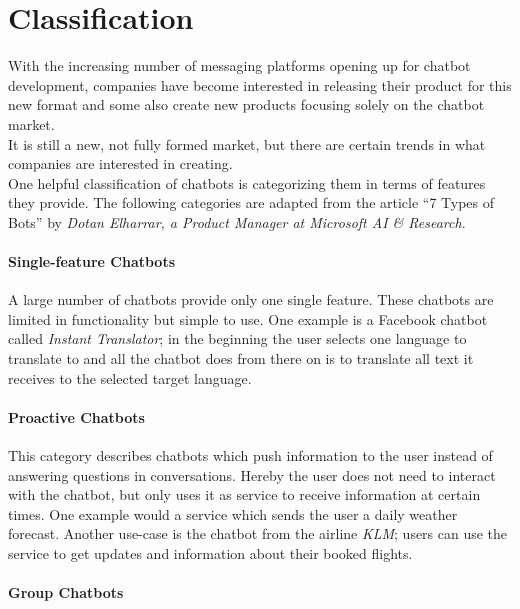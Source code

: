 \section{Classification}
\label{classification}


With the increasing number of messaging platforms opening up for chatbot development,
companies have become interested in releasing their product for this new format and some also create new products focusing solely on the chatbot market.
\\

It is still a new, not fully formed market, but there are certain trends in what companies are interested in creating.
\\

One helpful classification of chatbots is categorizing them in terms of features they provide.
The following categories are adapted from the article ``7 Types of Bots'' by \emph{Dotan Elharrar, a Product Manager at Microsoft AI \& Research}\cite{bottypes}.


\paragraph{Single-feature Chatbots}

A large number of chatbots provide only one single feature.
These chatbots are limited in functionality but simple to use.
One example is a Facebook chatbot called \emph{Instant Translator}\cite{instanttranslator};
in the beginning the user selects one language to translate to and all the chatbot does from there on is to translate all text it receives to the selected target language.


\paragraph{Proactive Chatbots}

This category describes chatbots which push information to the user instead of answering questions in conversations.
Hereby the user does not need to interact with the chatbot, but only uses it as service to receive information at certain times.
One example would a service which sends the user a daily weather forecast.
Another use-case is the chatbot from the airline \emph{KLM}\cite{klm}; users can use the service to get updates and information about their booked flights.


\paragraph{Group Chatbots}

